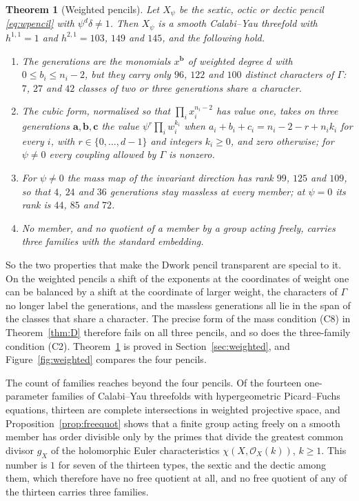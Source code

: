 \documentclass[11pt]{amsart}
\newtheorem{theorem}{Theorem}
\theoremstyle{definition}
\theoremstyle{remark}
\newcommand{\cO}{\mathcal{O}}
\newcommand{\bb}{\mathbf{b}}
\newcommand{\cc}{\mathbf{c}}
\newcommand{\va}{\mathbf{a}}
\begin{document}
\begin{theorem}[Weighted pencils]\label{thm:E}
Let $X_\psi$ be the sextic, octic or dectic pencil \eqref{eq:wpencil} with
$\psi^d\delta\ne1$. Then $X_\psi$ is a smooth Calabi--Yau threefold with
$h^{1,1}=1$ and $h^{2,1}=103$, $149$ and $145$, and the following hold.
\begin{enumerate}[label=\textup{(\roman*)},leftmargin=*,itemsep=1pt]
\item The generations are the monomials $x^{\bb}$ of weighted degree $d$
with $0\le b_i\le n_i-2$, but they carry only $96$, $122$ and $100$
distinct characters of $\Gamma$: $7$, $27$ and $42$ classes of two or three
generations share a character.
\item The cubic form, normalised so that $\prod_ix_i^{n_i-2}$ has value
one, takes on three generations $\va,\bb,\cc$ the value
$\psi^r\prod_iw_i^{k_i}$ when $a_i+b_i+c_i=n_i-2-r+n_ik_i$ for every $i$,
with $r\in\{0,\dots,d-1\}$ and integers $k_i\ge0$, and zero otherwise; for
$\psi\ne0$ every coupling allowed by $\Gamma$ is nonzero.
\item For $\psi\ne0$ the mass map of the invariant direction has rank
$99$, $125$ and $109$, so that $4$, $24$ and $36$ generations stay massless
at every member; at $\psi=0$ its rank is $44$, $85$ and $72$.
\item No member, and no quotient of a member by a group acting freely,
carries three families with the standard embedding.
\end{enumerate}
\end{theorem}

So the two properties that make the Dwork pencil transparent are special
to it. On the weighted pencils a shift of the exponents at the coordinates
of weight one can be balanced by a shift at the coordinate of larger
weight, the characters of $\Gamma$ no longer label the generations, and the
massless generations all lie in the span of the classes that share a
character. The precise form of the mass condition (C8) in
Theorem~\ref{thm:D} therefore fails on all three pencils, and so does the
three-family condition (C2). Theorem~\ref{thm:E} is proved in
Section~\ref{sec:weighted}, and Figure~\ref{fig:weighted} compares the four
pencils.

The count of families reaches beyond the four pencils. Of the fourteen
one-parameter families of Calabi--Yau threefolds with hypergeometric
Picard--Fuchs equations, thirteen are complete intersections in weighted
projective space, and Proposition~\ref{prop:freequot} shows that a finite
group acting freely on a smooth member has order divisible only by the
primes that divide the greatest common divisor $g_X$ of the holomorphic
Euler characteristics $\chi(X,\cO_X(k))$, $k\ge1$. This number is $1$ for
seven of the thirteen types, the sextic and the dectic among them, which
therefore have no free quotient at all, and no free quotient of any of the
thirteen carries three families.
\end{document}
